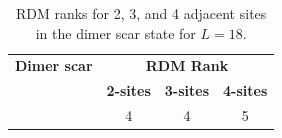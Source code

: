 \documentclass[11pt]{article}
\begin{document}
\begin{itemize}
\begin{itemize}
	\begin{table}[h]
	\centering
	\begin{tabular}{|c|ccc|}
	\hline
	\textbf{Dimer scar} & \multicolumn{3}{c|}{\textbf{RDM  Rank}} \\
	\cline{2-4}
	& \textbf{2-sites} & \textbf{3-sites} & \textbf{4-sites} \\
	\hline
	\text{$| \text{dimer} \rangle$} & 4 & 4 & 5 \\
	\hline
	\end{tabular}
	\caption{RDM ranks for 2, 3, and 4 adjacent sites in the dimer scar state for $L=18$.}
	\label{tab:ranks}
	\end{table}

\end{itemize}
\end{itemize}

\vspace{0.3cm}
\end{document}
